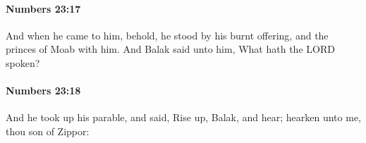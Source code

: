 		\paragraph{Numbers 23:17} %
			\label{NUMBERS-23-17}

			And when he came to him, behold, he stood by his burnt offering, and the princes of Moab with him. And Balak said unto him, What hath the LORD spoken?


		\paragraph{Numbers 23:18} %
			\label{NUMBERS-23-18}

			And he took up his parable, and said, Rise up, Balak, and hear; hearken unto me, thou son of Zippor:


